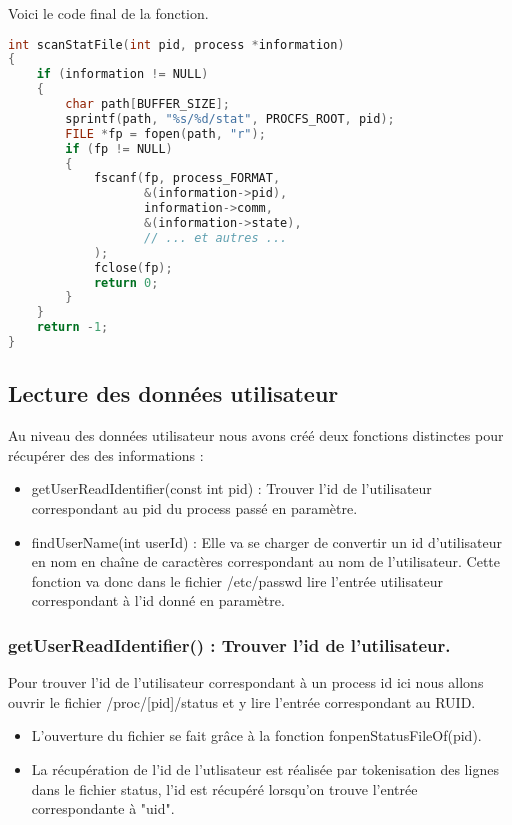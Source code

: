 Voici le code final de la fonction. 
\begin{lstlisting}[frame=single, language=c]
int scanStatFile(int pid, process *information)
{
    if (information != NULL)
    {
        char path[BUFFER_SIZE];
        sprintf(path, "%s/%d/stat", PROCFS_ROOT, pid);
        FILE *fp = fopen(path, "r");
        if (fp != NULL)
        {
            fscanf(fp, process_FORMAT,
                   &(information->pid),
                   information->comm,
                   &(information->state),
                   // ... et autres ...
            );
            fclose(fp);
            return 0;
        }
    }
    return -1;
}
\end{lstlisting}

\subsection{Lecture des données utilisateur}
Au niveau des données utilisateur nous avons créé deux fonctions distinctes pour récupérer des des informations :

\begin{itemize}
\item getUserReadIdentifier(const int pid) : Trouver l'id de l'utilisateur correspondant au pid du process passé en paramètre.

\item findUserName(int userId) : Elle va se charger de convertir un id d’utilisateur en nom en chaîne de caractères correspondant au nom de l’utilisateur. Cette fonction va donc dans le fichier /etc/passwd lire l’entrée utilisateur correspondant à l’id donné en paramètre.
\end{itemize}

\subsubsection{getUserReadIdentifier() : Trouver l'id de l'utilisateur.}
Pour trouver l'id de l'utilisateur correspondant à un process id ici nous allons ouvrir le fichier /proc/[pid]/status et y lire l'entrée correspondant au RUID.

\begin{itemize}
\item L'ouverture du fichier se fait grâce à la fonction fonpenStatusFileOf(pid).

\item La récupération de l'id de l'utlisateur est réalisée par tokenisation des lignes dans le fichier status, l'id est récupéré lorsqu'on trouve l'entrée correspondante à "uid".
\end{itemize}

